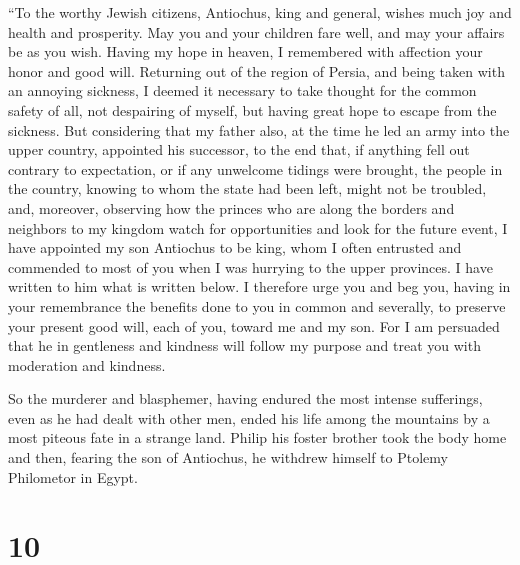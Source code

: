  ``To the worthy Jewish citizens, Antiochus, king and
general, wishes much joy and health and prosperity.  May
you and your children fare well, and may your affairs be as you wish.
Having my hope in heaven,  I remembered with affection your
honor and good will. Returning out of the region of Persia, and being
taken with an annoying sickness, I deemed it necessary to take thought
for the common safety of all,  not despairing of myself,
but having great hope to escape from the sickness.  But
considering that my father also, at the time he led an army into the
upper country, appointed his successor,  to the end that,
if anything fell out contrary to expectation, or if any unwelcome
tidings were brought, the people in the country, knowing to whom the
state had been left, might not be troubled,  and, moreover,
observing how the princes who are along the borders and neighbors to my
kingdom watch for opportunities and look for the future event, I have
appointed my son Antiochus to be king, whom I often entrusted and
commended to most of you when I was hurrying to the upper provinces. I
have written to him what is written below.  I therefore
urge you and beg you, having in your remembrance the benefits done to
you in common and severally, to preserve your present good will, each of
you, toward me and my son.  For I am persuaded that he in
gentleness and kindness will follow my purpose and treat you with
moderation and kindness.

 So the murderer and blasphemer, having endured the most
intense sufferings, even as he had dealt with other men, ended his life
among the mountains by a most piteous fate in a strange land.
 Philip his foster brother took the body home and then,
fearing the son of Antiochus, he withdrew himself to Ptolemy Philometor
in Egypt.

\hypertarget{section-8}{%
\section{10}\label{section-8}}

